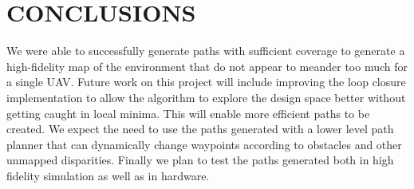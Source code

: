 \documentclass[letterpaper, 10 pt, conference]{ieeeconf}  %
\begin{document}
\section{CONCLUSIONS}\label{conclusions}

We were able to successfully generate paths with sufficient coverage to generate a high-fidelity map of the environment that do not appear to meander too much for a single UAV. Future work on this project will include improving the loop closure implementation to allow the algorithm to explore the design space better without getting caught in local minima. This will enable more efficient paths to be created. We expect the need to use the paths generated with a lower level path planner that can dynamically change waypoints according to obstacles and other unmapped disparities. Finally we plan to test the paths generated both in high fidelity simulation as well as in hardware.



\end{document}
